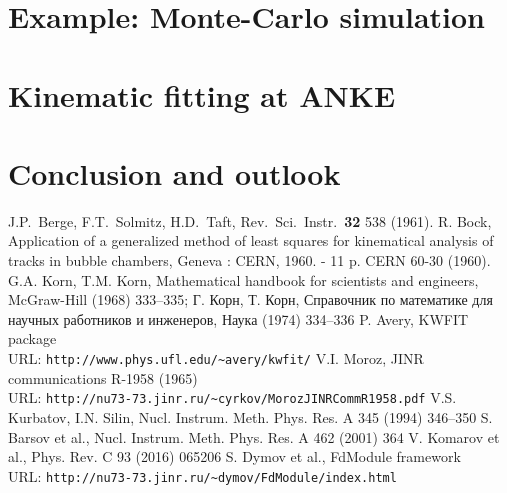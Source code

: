 \documentclass{webofc}
\begin{document}
\section{Example: Monte-Carlo simulation}
\section{Kinematic fitting at ANKE}
\section{Conclusion and outlook}

\begin{thebibliography}{00}
 J.P.~Berge, F.T.~Solmitz, H.D.~Taft, Rev.\ Sci.\ Instr.\ \textbf{32} 538 (1961).
 R. Bock, Application of a generalized method of least squares for kinematical analysis of tracks in bubble chambers,       Geneva : CERN, 1960. - 11 p. CERN 60-30 (1960).
 G.A. Korn, T.M. Korn, Mathematical handbook for scientists and engineers, McGraw-Hill (1968) 333--335; \foreignlanguage{russian}{Г. Корн, Т. Корн, Справочник по математике для научных работников и инженеров, Наука (1974) 334--336}
 P. Avery, KWFIT package\\ URL: \texttt{http://www.phys.ufl.edu/\textasciitilde{}avery/kwfit/}
 V.I. Moroz, JINR communications R-1958 (1965)\\ URL: \texttt{http://nu73-73.jinr.ru/\textasciitilde{}cyrkov/MorozJINRCommR1958.pdf}
 V.S. Kurbatov, I.N. Silin, Nucl. Instrum. Meth. Phys. Res. A 345 (1994) 346--350
 S. Barsov et al., Nucl. Instrum. Meth. Phys. Res. A 462 (2001) 364
 V. Komarov et al., Phys. Rev. C 93 (2016) 065206
 S. Dymov et al., FdModule framework\\ URL: \texttt{http://nu73-73.jinr.ru/\textasciitilde{}dymov/FdModule/index.html}


\end{thebibliography}
\end{document}

